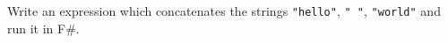 Write an expression which concatenates the strings \lstinline{"hello"}, \lstinline{" "}, \lstinline{"world"} and run it in F\#.